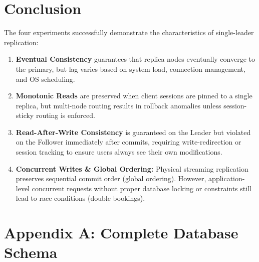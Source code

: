 \documentclass[12pt]{article}
\begin{document}
\section{Conclusion}
The four experiments successfully demonstrate the characteristics of single-leader replication:
\begin{enumerate}
    \item \textbf{Eventual Consistency} guarantees that replica nodes eventually converge to the primary, but lag varies based on system load, connection management, and OS scheduling.
    \item \textbf{Monotonic Reads} are preserved when client sessions are pinned to a single replica, but multi-node routing results in rollback anomalies unless session-sticky routing is enforced.
    \item \textbf{Read-After-Write Consistency} is guaranteed on the Leader but violated on the Follower immediately after commits, requiring write-redirection or session tracking to ensure users always see their own modifications.
    \item \textbf{Concurrent Writes \& Global Ordering:} Physical streaming replication preserves sequential commit order (global ordering). However, application-level concurrent requests without proper database locking or constraints still lead to race conditions (double bookings).
\end{enumerate}

\newpage

\appendix

\section{Appendix A: Complete Database Schema}
\end{document}

